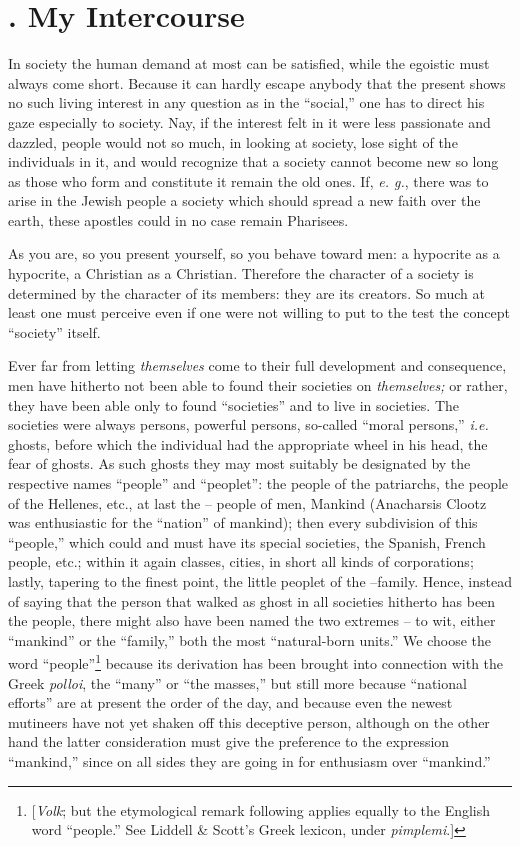 \documentclass[12pt,a4paper]{book}
\begin{document}
\section[2. My Intercourse]{. My Intercourse}

In society the human demand at most can be satisfied, while the egoistic must 
always come short. Because it can hardly escape anybody that the present shows 
no such living interest in any question as in the ``social,'' one has to 
direct his gaze especially to society. Nay, if the interest felt in it were 
less passionate and dazzled, people would not so much, in looking at society, 
lose sight of the individuals in it, and would recognize that a society cannot 
become new so long as those who form and constitute it remain the old ones. 
If, \textit{e. g.}, there was to arise in the Jewish people a society which 
should spread a new faith over the earth, these apostles could in no case 
remain Pharisees.

As you are, so you present yourself, so you behave toward men: a hypocrite as 
a hypocrite, a Christian as a Christian. Therefore the character of a society 
is determined by the character of its members: they are its creators. So much 
at least one must perceive even if one were not willing to put to the test the 
concept ``society'' itself.

Ever far from letting \textit{themselves} come to their full development and 
consequence, men have hitherto not been able to found their societies on 
\textit{themselves;} or rather, they have been able only to found 
``societies'' and to live in societies. The societies were always persons, 
powerful persons, so-called ``moral persons,'' \textit{i.e.} ghosts, before 
which the individual had the appropriate wheel in his head, the fear of 
ghosts. As such ghosts they may most suitably be designated by the respective 
names ``people'' and ``peoplet'': the people of the patriarchs, the people 
of the Hellenes, etc., at last the -- people of men, Mankind (Anacharsis 
Clootz was enthusiastic for the ``nation'' of mankind); then every 
subdivision of this ``people,'' which could and must have its special 
societies, the Spanish, French people, etc.; within it again classes, cities, 
in short all kinds of corporations; lastly, tapering to the finest point, the 
little peoplet of the --family. Hence, instead of saying that the person that 
walked as ghost in all societies hitherto has been the people, there might 
also have been named the two extremes -- to wit, either ``mankind'' or the 
``family,'' both the most ``natural-born units.'' We choose the word 
``people''\footnote{[\textit{Volk}; but the etymological remark following 
applies equally to the English word ``people.'' See Liddell \& Scott's Greek 
lexicon, under \textit{pimplemi}.]} because its derivation has been brought 
into connection with the Greek \textit{polloi}, the ``many'' or ``the 
masses,'' but still more because ``national efforts'' are at present the 
order of the day, and because even the newest mutineers have not yet shaken 
off this deceptive person, although on the other hand the latter consideration 
must give the preference to the expression ``mankind,'' since on all sides 
they are going in for enthusiasm over ``mankind.''
\end{document}
